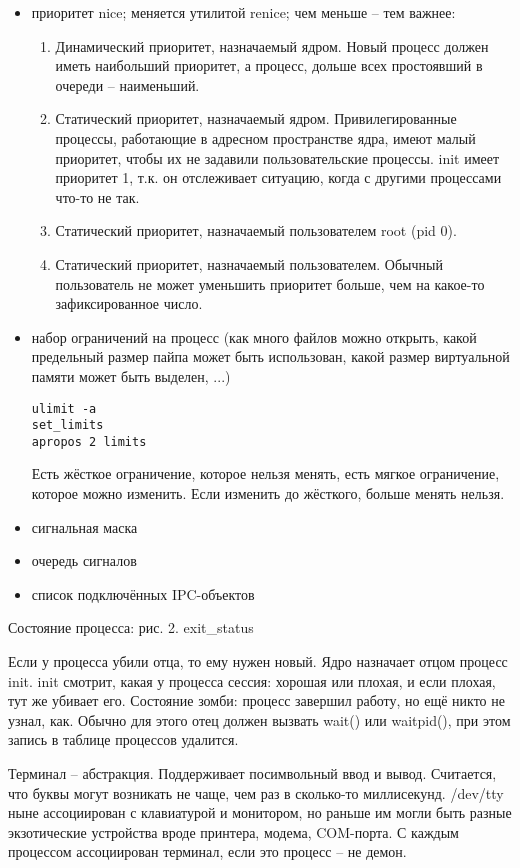 \documentclass[a4paper,10pt]{article}
\begin{document}
\begin{enumerate}
\begin{enumerate}
\begin{itemize}
\item приоритет nice; меняется утилитой renice; чем меньше -- тем важнее: 
\begin{enumerate}
 \item Динамический приоритет, назначаемый ядром. Новый процесс должен иметь наибольший приоритет, а процесс, дольше всех простоявший в очереди -- наименьший.
 \item Статический приоритет, назначаемый ядром. Привилегированные процессы, работающие в адресном пространстве ядра, имеют малый приоритет, чтобы их не задавили пользовательские процессы. init имеет приоритет 1, т.к. он отслеживает ситуацию, когда с другими процессами что-то не так.
 \item Статический приоритет, назначаемый пользователем root (pid 0).
 \item Статический приоритет, назначаемый пользователем. Обычный пользователь не может уменьшить приоритет больше, чем на какое-то зафиксированное число.
\end{enumerate}
\item набор ограничений на процесс (как много файлов можно открыть, какой предельный размер пайпа может быть использован, какой размер виртуальной памяти может быть выделен, ...)

\begin{verbatim}
ulimit -a 
set_limits
apropos 2 limits
\end{verbatim}

Есть жёсткое ограничение, которое нельзя менять, есть мягкое ограничение, которое можно изменить. Если изменить до жёсткого, больше менять нельзя.

\item сигнальная маска
\item очередь сигналов
\item список подключённых IPC-объектов
\end{itemize}
\end{enumerate}
\end{enumerate}
Состояние процесса: рис. 2.
exit\_status

Если у процесса убили отца, то ему нужен новый. Ядро назначает отцом процесс init. init смотрит, какая у процесса сессия: хорошая или плохая, и если плохая, тут же убивает его.
Состояние зомби: процесс завершил работу, но ещё никто не узнал, как. Обычно для этого отец должен вызвать wait() или waitpid(), при этом запись в таблице процессов удалится.

Терминал -- абстракция. Поддерживает посимвольный ввод и вывод. Считается, что буквы могут возникать не чаще, чем раз в сколько-то миллисекунд. /dev/tty ныне ассоциирован с клавиатурой и монитором, но раньше им могли быть разные экзотические устройства вроде принтера, модема, COM-порта. С каждым процессом ассоциирован терминал, если это процесс -- не демон.
\end{document}
